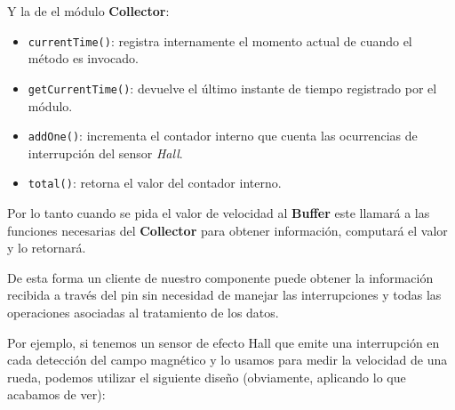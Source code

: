 Y la de el módulo \textbf{Collector}:
\begin{itemize}
    \item \verb|currentTime()|: registra internamente el momento actual de cuando el método es invocado.
    \item \verb|getCurrentTime()|: devuelve el último instante de tiempo registrado por el módulo.
    \item \verb|addOne()|: incrementa el contador interno que cuenta las ocurrencias de interrupción del sensor \textit{Hall}.
    \item \verb|total()|: retorna el valor del contador interno.
\end{itemize}

Por lo tanto cuando se pida el valor de velocidad al \textbf{Buffer} este llamará a las funciones necesarias del \textbf{Collector} para obtener información, computará el valor y lo retornará.

De esta forma un cliente de nuestro componente puede obtener la información recibida a través del pin sin necesidad de manejar las interrupciones y todas las operaciones asociadas al tratamiento de los datos.

Por ejemplo, si tenemos un sensor de efecto Hall que emite una interrupción en cada detección del campo magnético y lo usamos para medir la velocidad de una rueda, podemos utilizar el siguiente diseño (obviamente, aplicando lo que acabamos de ver):

